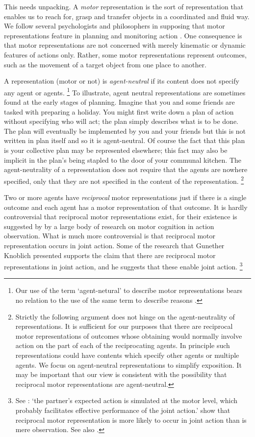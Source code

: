 \documentclass[12pt,\papersize]{extarticle}
\begin{document}
This needs unpacking. 
A \textit{motor} representation is the sort of representation that enables us to reach for, grasp and transfer objects in a coordinated and fluid way.
We follow several psychologists and philosophers in supposing that motor representations feature in planning and monitoring action \citep[e.g.]{wolpert:1995internal, miall:1996_forward}.
One consequence is that motor representations are not concerned with merely kinematic or dynamic features of actions only.
Rather, some motor representations represent outcomes, such as the movement of a target object from one place to another.

A representation (motor or not) is \emph{agent-neutral} if its content does not specify any agent or agents.%
\footnote{
Our use of the term `agent-netural' to describe motor representations bears no relation to the use of the same term  to describe reasons \citep[on the latter, see][]{Parfit:1984fk}.
}
To illustrate, agent neutral representations are sometimes found at the early stages of planning.
Imagine that you and some friends are tasked with preparing a holiday.  
You might first write down a plan of action without specifying who will act; the plan simply describes what is to be done.
The plan  will eventually be implemented by you and your friends
 but this is not written in plan itself  and so it is agent-neutral.
Of course the fact that this plan is your collective plan may be represented elsewhere; this fact may also be implicit in  the plan's being stapled to the door of your communal kitchen.
The agent-neutrality of a representation does not require that the agents are nowhere specified, only that they are not specified in the content of the representation.%
\footnote{
Strictly the following argument does not hinge on the agent-neutrality of representations.
It is sufficient for our purposes that there are reciprocal motor representations  of outcomes whose obtaining would normally involve action on the part of each of the reciprocating agents.
In principle such representations could have contents which specify other agents or multiple agents. 
We focus on agent-neutral representations to simplify exposition.
It may be important that our view is consistent with the possibility that reciprocal motor representations are agent-neutral. 
}

Two or more agents have \emph{reciprocal} motor representations  just if there is a single outcome and each agent has a motor representation of that outcome. 
It is hardly controversial that reciprocal motor representations exist, for their existence is suggested by by a large body of research on motor cognition in action observation.
What is much more controversial is that reciprocal motor representation occurs in joint action.
Some of the research that Gunether Knoblich presented supports the claim that there are reciprocal motor representations in joint action, and he suggests that these enable joint action.%
\footnote{
See \citet{kourtis:2012_predictive}: `the partner’s expected action is simulated at the motor level, which probably facilitates effective performance of the joint action.'
\citet{kourtis:2010_favoritism} show that 
reciprocal motor representation is more likely to occur in joint action than is mere observation. 
See also \citet{Knoblich:2003nf}.
 }
\end{document}

